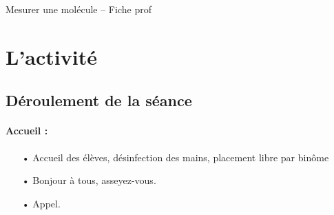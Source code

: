 \documentclass[12pt,a4paper]{article}
\begin{document}
\begin{header}
Mesurer une molécule -- Fiche prof
\end{header}

\section{L'activité}

\subsection{Déroulement de la séance}

\paragraph{Accueil :}
\begin{itemize}
\item[•] Accueil des élèves, désinfection des mains, placement libre par binôme
\item[•]\og Bonjour à tous, asseyez-vous. \fg{}
\item[•] Appel.
\end{itemize}
\end{document}

